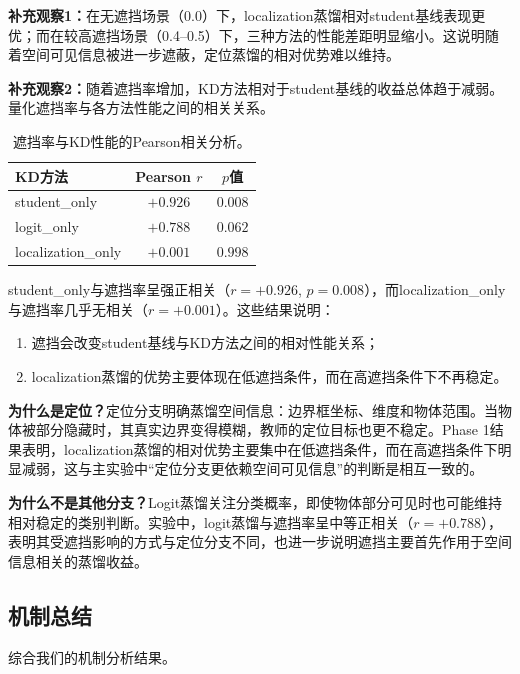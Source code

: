 \textbf{补充观察1：}在无遮挡场景（0.0）下，localization蒸馏相对student基线表现更优；而在较高遮挡场景（0.4--0.5）下，三种方法的性能差距明显缩小。这说明随着空间可见信息被进一步遮蔽，定位蒸馏的相对优势难以维持。

\textbf{补充观察2：}随着遮挡率增加，KD方法相对于student基线的收益总体趋于减弱。量化遮挡率与各方法性能之间的相关关系。

\begin{table}[htbp]
\centering
\caption{遮挡率与KD性能的Pearson相关分析。}
\label{tab:occlusion_corr}
\begin{tabular}{@{}lcc@{}}
\toprule
KD方法 & Pearson $r$ & $p$值 \\
\midrule
student\_only & $\mathbf{+0.926}$ & $\mathbf{0.008}$ \\
logit\_only & $+0.788$ & $0.062$ \\
localization\_only & $+0.001$ & $0.998$ \\
\bottomrule
\end{tabular}
\end{table}

student\_only与遮挡率呈强正相关（$r = +0.926$, $p = 0.008$），而localization\_only与遮挡率几乎无相关（$r = +0.001$）。这些结果说明：
\begin{enumerate}
    \item 遮挡会改变student基线与KD方法之间的相对性能关系；
    \item localization蒸馏的优势主要体现在低遮挡条件，而在高遮挡条件下不再稳定。
\end{enumerate}

\textbf{为什么是定位？}定位分支明确蒸馏空间信息：边界框坐标、维度和物体范围。当物体被部分隐藏时，其真实边界变得模糊，教师的定位目标也更不稳定。Phase 1结果表明，localization蒸馏的相对优势主要集中在低遮挡条件，而在高遮挡条件下明显减弱，这与主实验中“定位分支更依赖空间可见信息”的判断是相互一致的。

\textbf{为什么不是其他分支？}Logit蒸馏关注分类概率，即使物体部分可见时也可能维持相对稳定的类别判断。实验中，logit蒸馏与遮挡率呈中等正相关（$r = +0.788$），表明其受遮挡影响的方式与定位分支不同，也进一步说明遮挡主要首先作用于空间信息相关的蒸馏收益。

\subsection{机制总结}

综合我们的机制分析结果。

